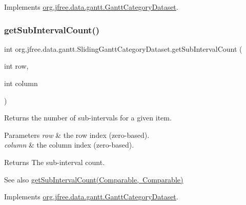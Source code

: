 Implements \mbox{\hyperlink{interfaceorg_1_1jfree_1_1data_1_1gantt_1_1_gantt_category_dataset_af4749dc6ab0b5b67535b4ea0fa88f190}{org.\+jfree.\+data.\+gantt.\+Gantt\+Category\+Dataset}}.

\mbox{\label{classorg_1_1jfree_1_1data_1_1gantt_1_1_sliding_gantt_category_dataset_a2d8acd9a0033c1e36ae217dc067931b7}} 
\subsubsection{\texorpdfstring{get\+Sub\+Interval\+Count()}{getSubIntervalCount()}\hspace{0.1cm}{\footnotesize\ttfamily [2/2]}}
{\footnotesize\ttfamily int org.\+jfree.\+data.\+gantt.\+Sliding\+Gantt\+Category\+Dataset.\+get\+Sub\+Interval\+Count (\begin{DoxyParamCaption}\item[{int}]{row,  }\item[{int}]{column }\end{DoxyParamCaption})}

Returns the number of sub-\/intervals for a given item.


\begin{DoxyParams}{Parameters}
{\em row} & the row index (zero-\/based). \\
\hline
{\em column} & the column index (zero-\/based).\\
\hline
\end{DoxyParams}
\begin{DoxyReturn}{Returns}
The sub-\/interval count.
\end{DoxyReturn}
\begin{DoxySeeAlso}{See also}
\mbox{\hyperlink{classorg_1_1jfree_1_1data_1_1gantt_1_1_sliding_gantt_category_dataset_a4b8246a1601e700946bace11c5b0dc33}{get\+Sub\+Interval\+Count(\+Comparable, Comparable)}} 
\end{DoxySeeAlso}


Implements \mbox{\hyperlink{interfaceorg_1_1jfree_1_1data_1_1gantt_1_1_gantt_category_dataset_a290ee496bed2a6688f43e56c0824bb01}{org.\+jfree.\+data.\+gantt.\+Gantt\+Category\+Dataset}}.

